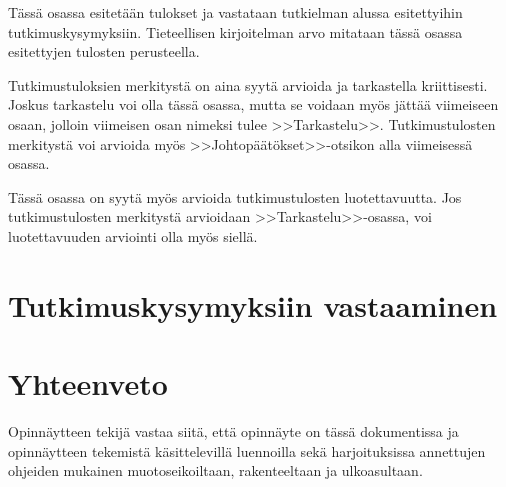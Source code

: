 \documentclass[finnish,12pt,a4paper,pdftex]{article}
\begin{document}
Tässä osassa esitetään tulokset ja vastataan tutkielman alussa
esitettyihin tutkimuskysymyksiin. Tieteellisen kirjoitelman
arvo mitataan tässä osassa esitettyjen tulosten perusteella. 

Tutkimustuloksien merkitystä on aina syytä arvioida ja tarkastella
kriittisesti.  Joskus tarkastelu voi olla tässä osassa, mutta se
voidaan myös jättää viimeiseen osaan, jolloin viimeisen osan nimeksi
tulee >>Tarkastelu>>. Tutkimustulosten merkitystä voi arvioida myös
>>Johtopäätökset>>-otsikon alla viimeisessä osassa. 

Tässä osassa on syytä myös arvioida tutkimustulosten luotettavuutta.
Jos tutkimustulosten merkitystä arvioidaan >>Tarkastelu>>-osassa,
voi luotettavuuden arviointi olla myös siellä. 

\clearpage

\section{Tutkimuskysymyksiin vastaaminen}

\section{Yhteenveto}

Opinnäytteen tekijä vastaa siitä, että opinnäyte on tässä dokumentissa
ja opinnäytteen tekemistä käsittelevillä luennoilla sekä
harjoituksissa annettujen ohjeiden mukainen muotoseikoiltaan,
rakenteeltaan ja ulkoasultaan.



\clearpage


\end{document}
